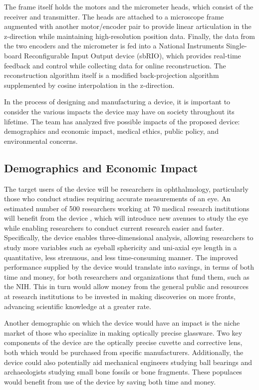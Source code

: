 \documentclass{article}
\begin{document}
The frame itself holds the motors and the micrometer heads, which
consist of the receiver and transmitter. The heads are attached to a
microscope frame augmented with another motor/encoder pair to provide
linear articulation in the z-direction while maintaining
high-resolution position data. Finally, the data from the two encoders
and the micrometer is fed into a National Instruments Single-board
Reconfigurable Input Output device (sbRIO), which provides real-time
feedback and control while collecting data for online
reconstruction. The reconstruction algorithm itself is a modified
back-projection algorithm supplemented by cosine interpolation in the
z-direction.
 
In the process of designing and manufacturing a device, it is
important to consider the various impacts the device may have on
society throughout its lifetime. The team has analyzed five possible
impacts of the proposed device: demographics and economic impact,
medical ethics, public policy, and environmental concerns.
 
 
\subsection{Demographics and Economic Impact}
\label{sec:Demographics}
 
The target users of the device will be researchers in ophthalmology,
particularly those who conduct studies requiring accurate measurements
of an eye. An estimated number of 500 researchers working at 70
medical research institutions will benefit from the device
\cite{Nickerson}, which will introduce new avenues to study the eye
while enabling researchers to conduct current research easier and
faster. Specifically, the device enables three-dimensional analysis,
allowing researchers to study more variables such as eyeball
sphericity and uni-axial eye length in a quantitative, less strenuous,
and less time-consuming manner. The improved performance supplied by
the device would translate into savings, in terms of both time and
money, for both researchers and organizations that fund them, such as
the NIH. This in turn would allow money from the general public
and resources at research institutions to be invested in making
discoveries on more fronts, advancing scientific knowledge at a
greater rate.
 
Another demographic on which the device would have an impact is the
niche market of those who specialize in making optically precise
glassware. Two key components of the device are the optically precise
cuvette and corrective lens, both which would be purchased from
specific manufacturers. Additionally, the device could also
potentially aid mechanical engineers studying ball bearings and
archaeologists studying small bone fossils or bone fragments. These
populaces would benefit from use of the device by saving both time and
money.
\end{document}
